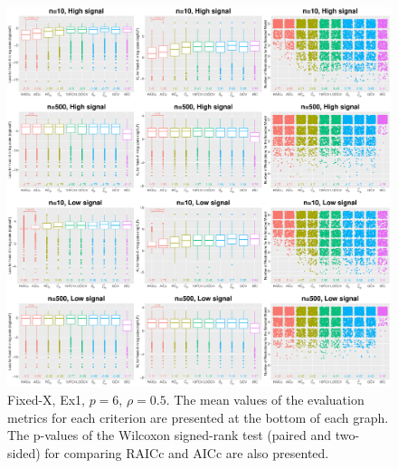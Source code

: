 \begin{figure}[!ht]
  \centering
  \includegraphics[width=\textwidth]{figures/main/fixedx/general_restriction/Ex1.eps}
  \caption{Fixed-X, Ex1, $p=6$, $\rho=0.5$. The mean values of the evaluation metrics for each criterion are presented at the bottom of each graph. The p-values of the Wilcoxon signed-rank test (paired and two-sided) for comparing RAICc and AICc are also presented.}
  \label{fig:generalrestriction_fixedx}
\end{figure}